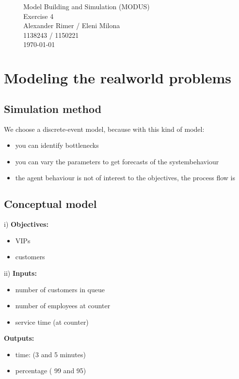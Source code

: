 \begin{figure}
\centering
{\Huge Model Building and Simulation (MODUS)}\\[0.5cm]
{\Huge Exercise 4}\\[0.5cm]
{\Large Alexander Rimer / Eleni Milona}\\[0.6cm]  
{\Large 1138243 / 1150221}\\[0.6cm]  
\today
\end{figure}

\section{Modeling the realworld problems}
\subsection{Simulation method}
We choose a discrete-event model, because with this kind of model:
\begin{itemize}
  	\item you can identify bottlenecks
	\item	you can vary the parameters to get forecasts of the systembehaviour
	\item	the agent behaviour is not of interest to the objectives, the process flow is
\end{itemize}

\subsection{Conceptual model}
i) 
	\textbf{Objectives:}
		\begin{itemize}	
		  \item VIPs
		  \item customers
		\end{itemize}
ii) 	
	\textbf{Inputs:}
		\begin{itemize}	
		  \item number of customers in queue
		  \item number of employees at counter
		  \item service time (at counter)
		\end{itemize}
		
	\textbf{Outputs:}
		\begin{itemize}	
		  \item time: (3 and 5 minutes)
		  \item percentage ( 99 and 95)
		\end{itemize}
		
